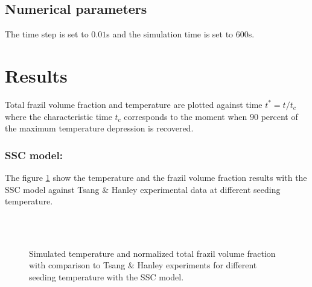 \subsection{Numerical parameters}

The time step is set to $0.01$s and the simulation time is set to $600$s.

\section{Results}

Total frazil volume fraction and temperature are plotted against time $t^*=t/t_c$ 
where the characteristic time $t_c$ corresponds to the
moment when $90$ percent of the maximum temperature depression is recovered.

\subsubsection{SSC model:}

The figure \ref{fig:tsang_monoclass}
show the temperature and the frazil volume fraction results with the SSC 
model against Tsang \& Hanley experimental data at different seeding temperature.

\begin{figure}[H]
    \begin{center}
        \\
        \\
    \end{center}
    \caption{Simulated temperature and normalized total frazil volume fraction with comparison to Tsang \& Hanley experiments for different seeding temperature with the SSC model.}
    \label{fig:tsang_monoclass}
\end{figure}


